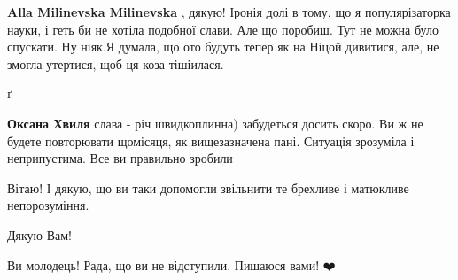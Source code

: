 \begin{itemize}
\begin{itemize}
\textbf{Alla Milinevska Milinevska} , дякую! Іронія долі в тому, що я
популярізаторка науки, і геть би не хотіла подобної слави. Але що поробиш. Тут
не можна було спускати. Ну ніяк.Я думала, що ото будуть тепер як на Ніцой
дивитися, але, не змогла утертися, щоб ця коза тішіилася.

 
ґ

 
\textbf{Оксана Хвиля} слава - річ швидкоплинна) забудеться досить скоро. Ви ж
не будете повторювати щомісяця, як вищезазначена пані. Ситуація зрозуміла і
неприпустима. Все ви правильно зробили
\end{itemize}

 
Вітаю! І дякую, що ви таки допомогли звільнити те брехливе і матюкливе непорозуміння.

 
Дякую Вам!

 
Ви молодець! Рада, що ви не відступили. Пишаюся вами! ❤️

 

\end{itemize}
